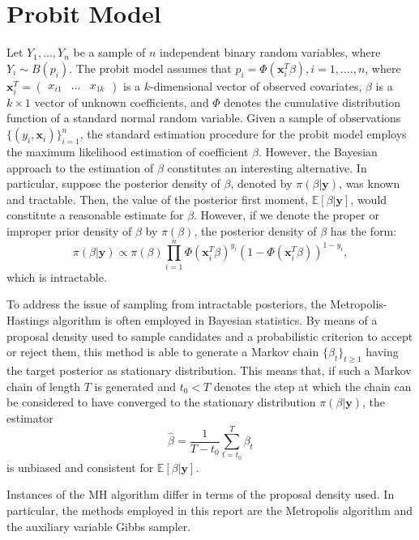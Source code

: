 \documentclass{article}
\newcommand{\EX}[0]{\mathbb{E}} %
\renewcommand{\vec}[1]{\mathbf{#1}}
\begin{document}
\section{Probit Model}
Let \(Y_1,...,Y_n\) be a sample of \(n\) independent binary random variables, where \(Y_i \sim B(p_i)\). The probit model assumes that \(p_i = \Phi(\vec{x}_i^T \beta), i = 1,....,n\), where \(\vec{x}_i^T = \begin{pmatrix} x_{i1} & \hdots & x_{1k} \end{pmatrix}\) is a \(k\)-dimensional vector of observed covariates, \(\beta\) is a \(k \times 1\) vector of unknown coefficients, and \(\Phi\) denotes the cumulative distribution function of a standard normal random variable. Given a sample of observations \(\{(y_i, \vec{x}_i)\}_{i=1}^n\), the standard estimation procedure for the probit model employs the maximum likelihood estimation of coefficient \(\beta\). However, the Bayesian approach to the estimation of \(\beta\) constitutes an interesting alternative. In particular, suppose the posterior density of \(\beta\), denoted by \(\pi(\beta|\vec{y})\),  was known and tractable. Then, the value of the posterior first moment, \(\EX[\beta|\vec{y}]\), would constitute a reasonable estimate for \(\beta\). However, if we denote the proper or improper prior density of \(\beta\) by \(\pi(\beta)\), the posterior density of \(\beta\) has the form:
\begin{equation*}
    \pi(\beta|\vec{y}) \propto \pi(\beta) \prod_{i=1}^n \Phi(\vec{x}_i^T \beta)^{y_i} (1 - \Phi(\vec{x}_i^T \beta))^{1 - y_i},
\end{equation*}
which is intractable.
\par 
To address the issue of sampling from intractable posteriors, the Metropolis-Hastings algorithm is often employed in Bayesian statistics. By means of a proposal density used to sample candidates and a probabilistic criterion to accept or reject them, this method is able to generate a Markov chain \(\{\beta_t\}_{t \geq 1}\) having the target posterior as stationary distribution. This means that, if such a Markov chain of length \(T\) is generated and \(t_0 < T\) denotes the step at which the chain can be considered to have converged to the stationary distribution \(\pi({\beta|\vec{y}})\), the estimator
\begin{equation*}
    \hat{\beta} = \frac{1}{T-t_0} \sum_{t=t_0}^T \beta_t
\end{equation*}
is unbiased and consistent for \(\EX[\beta|\vec{y}]\).
\par
Instances of the MH algorithm differ in terms of the proposal density used. In particular, the methods employed in this report are the Metropolis algorithm and the auxiliary variable Gibbs sampler.
\end{document}
